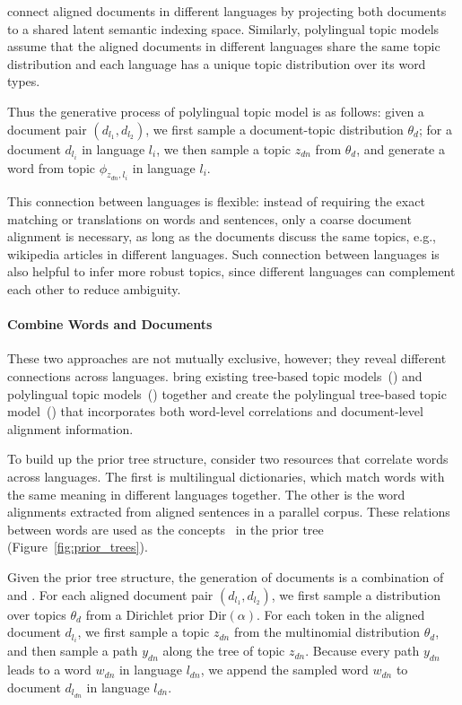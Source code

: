 \citet{Landauer-1990} connect aligned documents in different languages
by projecting both documents to a shared latent semantic indexing
space. Similarly, polylingual topic models~\citep[\plda{}]{mimno-09}
assume that the aligned documents in different languages share the
same topic distribution and each language has a unique topic
distribution over its word types.

Thus the generative process of polylingual topic model is as follows:
given a document pair $(d_{l_1}, d_{l_2})$, we first sample a
document-topic distribution $\theta_d$; for a document $d_{l_i}$ in
language $l_i$, we then sample a topic $z_{dn}$ from $\theta_d$, and
generate a word from topic $\phi_{z_{dn}, l_i}$ in language $l_i$.

This connection between languages is flexible: instead of requiring
the exact matching or translations on words and sentences, only a
coarse document alignment is necessary, as long as the documents
discuss the same topics, e.g., wikipedia articles in different
languages. Such connection between languages is also helpful to infer
more robust topics, since different languages can complement each
other to reduce ambiguity.


\paragraph{\bf Combine Words and Documents}

These two approaches are not mutually exclusive, however; they reveal
different connections across languages. \citet{hu-14} bring existing
tree-based topic models~(\tlda{}) and polylingual topic
models~(\plda{}) together and create the polylingual tree-based topic
model~(\ptlda{}) that incorporates both word-level correlations and
document-level alignment information.

To build up the prior tree structure, \citet{hu-14} consider two
resources that correlate words across languages. The first is
multilingual dictionaries, which match words with the same meaning in
different languages together. The other is the word alignments
extracted from aligned sentences in a parallel corpus. These relations
between words are used as the concepts~\citep{Bhattacharya-2006} in
the prior tree (Figure~\ref{fig:prior_trees}).

Given the prior tree structure, the generation of documents is a
combination of \tlda{} and \plda{}.  For each aligned document pair
$(d_{l_1}, d_{l_2})$, we first sample a distribution over topics
$\theta_d$ from a Dirichlet prior $\text{Dir}(\alpha)$.  For each
token in the aligned document $d_{l_i}$, we first sample a topic
$z_{dn}$ from the multinomial distribution $\theta_d$, and then sample
a path $y_{dn}$ along the tree of topic $z_{dn}$. Because every path
$y_{dn}$ leads to a word $w_{dn}$ in language $l_{dn}$, we append the
sampled word $w_{dn}$ to document $d_{l_{dn}}$ in language $l_{dn}$.

